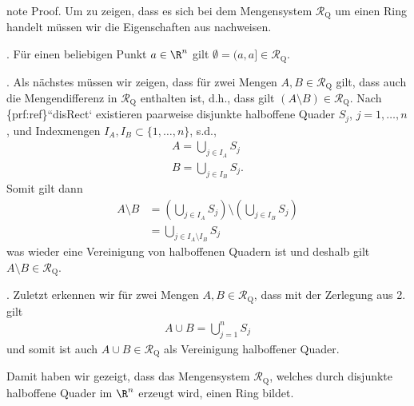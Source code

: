 \documentclass[letterpaper,10pt,german]{jupyterBook}
\begin{document}
\begin{sphinxadmonition}{note}
\sphinxAtStartPar
Proof. Um zu zeigen, dass es sich bei dem Mengensystem \(\mathcal{R}_{\text{Q}}\) um einen Ring handelt müssen wir die Eigenschaften aus {\hyperref[\detokenize{masstheorie/masstheorie:def:ring}]{}} nachweisen.

. Für einen beliebigen Punkt \(a \in \R^n\) gilt \(\emptyset = (a,a] \in \mathcal{R}_{\text{Q}}\).

. Als nächstes müssen wir zeigen, dass für zwei Mengen \(A,B \in \mathcal{R}_{\text{Q}}\) gilt, dass auch die Mengendifferenz in \(\mathcal{R}_{\text{Q}}\) enthalten ist, d.h., dass gilt \((A \setminus B) \in \mathcal{R}_{\text{Q}}\). Nach \{prf:ref\}``disRect` existieren paarweise disjunkte halboffene Quader \(S_j\), \(j=1,\ldots,n\), und Indexmengen \(I_A,I_B\subset\{1,\ldots,n\}\), s.d.,
\begin{equation*}
\begin{split}A = \bigcup_{j\in I_A} S_j\\
B = \bigcup_{j\in I_B} S_j.\end{split}
\end{equation*}
\sphinxAtStartPar
Somit gilt dann
\begin{equation*}
\begin{split}A\setminus B &= \left(\bigcup_{j\in I_A} S_j\right) \setminus \left(\bigcup_{j\in I_B} S_j\right)\\ 
&= \bigcup_{j\in I_A\setminus I_B} S_j\end{split}
\end{equation*}
\sphinxAtStartPar
was wieder eine Vereinigung von halboffenen Quadern ist und deshalb gilt \(A\setminus B\in \mathcal{R}_{\text{Q}}\).

. Zuletzt erkennen wir für zwei Mengen \(A,B \in \mathcal{R}_{\text{Q}}\), dass mit der Zerlegung aus 2. gilt
\begin{equation*}
\begin{split}A\cup B = \bigcup_{j=1}^n S_j\end{split}
\end{equation*}
\sphinxAtStartPar
und somit ist auch \(A\cup B\in\mathcal{R}_{\text{Q}}\) als Vereinigung halboffener Quader.

\sphinxAtStartPar
Damit haben wir gezeigt, dass das Mengensystem \(\mathcal{R}_{\text{Q}}\), welches durch disjunkte halboffene Quader im \(\R^n\) erzeugt wird, einen Ring bildet.
\end{sphinxadmonition}
\end{document}
